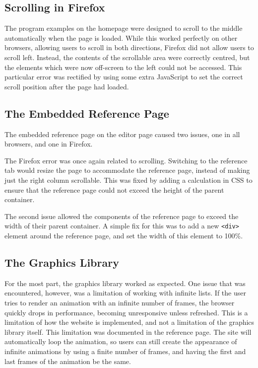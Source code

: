 \documentclass[../main.tex]{subfiles}
\begin{document}
        \subsection{Scrolling in Firefox}
            The program examples on the homepage were designed to scroll to the middle
                automatically when the page is loaded.
            While this worked perfectly on other browsers, allowing users to scroll in both
                directions, Firefox did not allow users to scroll left.
            Instead, the contents of the scrollable area were correctly centred, but the
                elements which were now off-screen to the left could not be accessed.
            This particular error was rectified by using some extra JavaScript to set the
                correct scroll position after the page had loaded.

        \subsection{The Embedded Reference Page}
            The embedded reference page on the editor page caused two issues, one in all
                browsers, and one in Firefox.

            The Firefox error was once again related to scrolling.
            Switching to the reference tab would resize the page to accommodate the
                reference page, instead of making just the right column scrollable.
            This was fixed by adding a calculation in CSS to ensure that the reference page
                could not exceed the height of the parent container.

            The second issue allowed the components of the reference page to exceed the
                width of their parent container.
            A simple fix for this was to add a new \texttt{<div>} element around the
                reference page, and set the width of this element to 100\%.

        \subsection{The Graphics Library}
            For the most part, the graphics library worked as expected.
            One issue that was encountered, however, was a limitation of working with
                infinite lists.
            If the user tries to render an animation with an infinite number of frames, the
                browser quickly drops in performance, becoming unresponsive unless refreshed.
            This is a limitation of how the website is implemented, and not a limitation of
                the graphics library itself.
            This limitation was documented in the reference page.
            The site will automatically loop the animation, so users can still create the
                appearance of infinite animations by using a finite number of frames, and
                having the first and last frames of the animation be the same.
\end{document}
